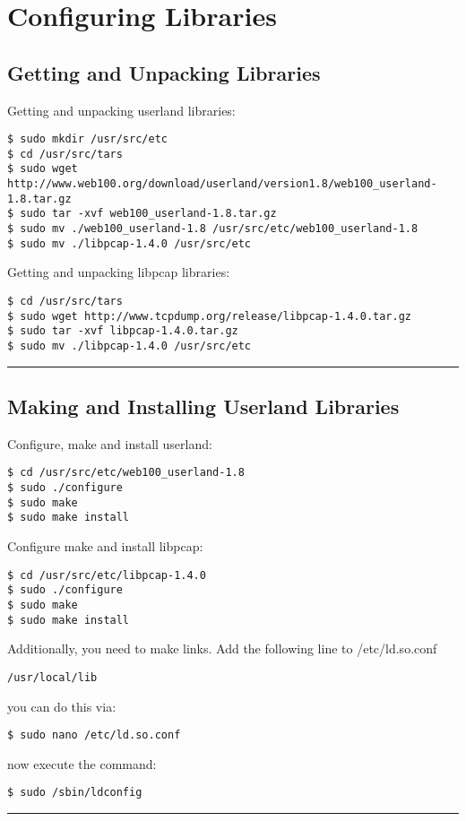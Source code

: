 \section{Configuring Libraries}

\subsection{Getting and Unpacking Libraries}
Getting and unpacking userland libraries:
\begin{snugshade}\begin{verbatim}
$ sudo mkdir /usr/src/etc
$ cd /usr/src/tars
$ sudo wget http://www.web100.org/download/userland/version1.8/web100_userland-1.8.tar.gz 
$ sudo tar -xvf web100_userland-1.8.tar.gz
$ sudo mv ./web100_userland-1.8 /usr/src/etc/web100_userland-1.8
$ sudo mv ./libpcap-1.4.0 /usr/src/etc
\end{verbatim}\end{snugshade}\noindent
Getting and unpacking libpcap libraries:
\begin{snugshade}\begin{verbatim}
$ cd /usr/src/tars
$ sudo wget http://www.tcpdump.org/release/libpcap-1.4.0.tar.gz
$ sudo tar -xvf libpcap-1.4.0.tar.gz
$ sudo mv ./libpcap-1.4.0 /usr/src/etc
\end{verbatim}\end{snugshade}\noindent

\hrule

\subsection{Making and Installing Userland Libraries}
Configure, make and install userland:
\begin{snugshade}\begin{verbatim}
$ cd /usr/src/etc/web100_userland-1.8
$ sudo ./configure 
$ sudo make
$ sudo make install
\end{verbatim}\end{snugshade}\noindent
Configure make and install libpcap:
\begin{snugshade}\begin{verbatim}
$ cd /usr/src/etc/libpcap-1.4.0
$ sudo ./configure 
$ sudo make
$ sudo make install
\end{verbatim}\end{snugshade}\noindent
Additionally, you need to make links. Add the following line to /etc/ld.so.conf 
\begin{snugshade}\begin{lstlisting}
/usr/local/lib
\end{lstlisting}\end{snugshade}\noindent
you can do this via:
\begin{snugshade}\begin{lstlisting}
$ sudo nano /etc/ld.so.conf
\end{lstlisting}\end{snugshade}\noindent
now execute the command:
\begin{snugshade}\begin{lstlisting}
$ sudo /sbin/ldconfig
\end{lstlisting}\end{snugshade}\noindent

\hrule

\newpage





